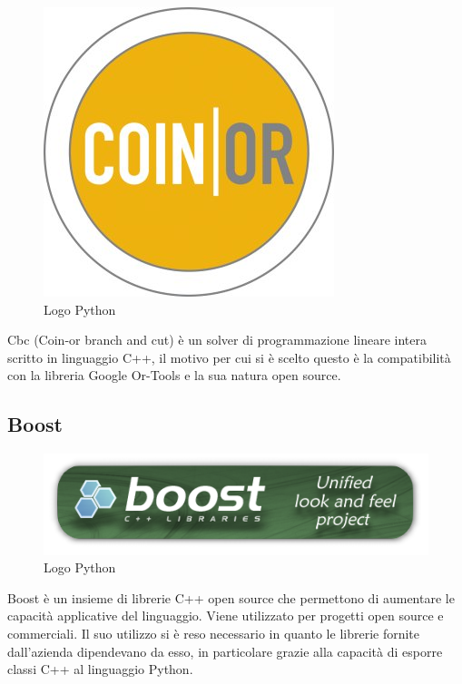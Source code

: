 \begin{figure}[H]
	\begin{center} \includegraphics[scale=0.8]{figures/coin_banner}
		\caption[Bin packing figures]{Logo Python}  
	\end{center}
\end{figure}
Cbc (Coin-or branch and cut) è un solver di programmazione lineare intera scritto in linguaggio C++, il motivo per cui si è scelto questo è la compatibilità con la libreria Google Or-Tools e la sua natura open source.

\subsection{Boost}
\begin{figure}[H]
	\begin{center} \includegraphics[scale=0.8]{figures/boost}
		\caption[Bin packing figures]{Logo Python}
	\end{center}
\end{figure}
Boost è un insieme di librerie C++ open source che permettono di aumentare le capacità applicative del linguaggio. Viene utilizzato per progetti open source e commerciali. Il suo utilizzo si è reso necessario in quanto le librerie fornite dall'azienda dipendevano da esso, in particolare grazie alla capacità di esporre classi C++ al linguaggio Python.

